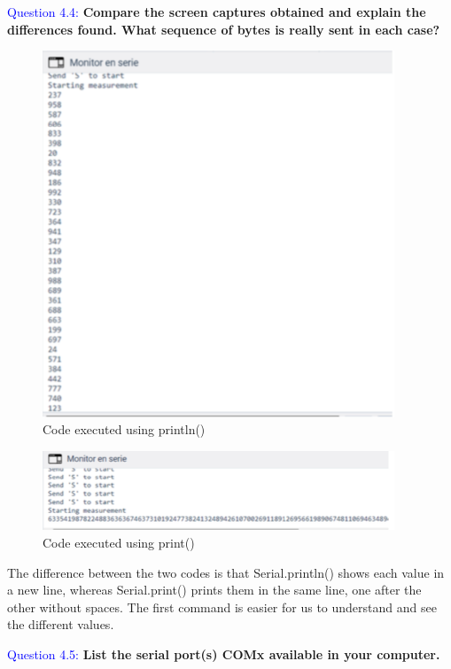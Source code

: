 \documentclass[12pt, a4papre]{article}
\begin{document}
	\textcolor{blue}{Question 4.4:} \textbf{Compare the screen captures obtained and explain the differences found. What sequence of bytes is really sent in each case?}
	
	\begin{figure}[H]
		\begin{center}
		\includegraphics[width=105mm]{pregunta4_4_1.png}
		\end{center}
		\caption{Code executed using println()}
	\end{figure}
	
	\begin{figure}[H]
		\begin{center}
		\includegraphics[width=105mm]{pregunta4_4_2.png}
		\end{center}
		\caption{Code executed using print()}
	\end{figure}
	
	The difference between the two codes is that Serial.println() shows each value in a new line, whereas Serial.print() prints them in the same line, one after the other without spaces. The first command is easier for us to understand and see the different values.

	\textcolor{blue}{Question 4.5:}  \textbf{List the serial port(s) COMx available in your computer. }
	
\end{document}
